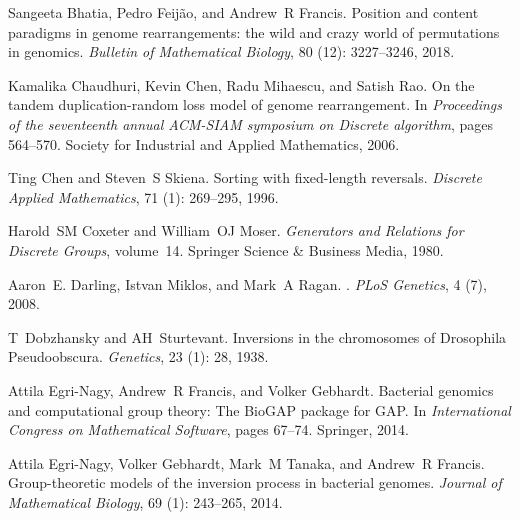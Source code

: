 \documentclass[utf8]{Frontiers_LaTex_Templates/frontiersFPHY} %
\numberwithin{equation}{section}
\begin{document}
\begin{thebibliography}{38}
Sangeeta Bhatia, Pedro Feij{\~a}o, and Andrew~R Francis.
\newblock Position and content paradigms in genome rearrangements: the wild and
  crazy world of permutations in genomics.
\newblock \emph{Bulletin of Mathematical Biology}, 80 (12):
  3227--3246, 2018.

Kamalika Chaudhuri, Kevin Chen, Radu Mihaescu, and Satish Rao.
\newblock On the tandem duplication-random loss model of genome rearrangement.
\newblock In \emph{Proceedings of the seventeenth annual ACM-SIAM symposium on
  Discrete algorithm}, pages 564--570. Society for Industrial and Applied
  Mathematics, 2006.

Ting Chen and Steven~S Skiena.
\newblock Sorting with fixed-length reversals.
\newblock \emph{Discrete Applied Mathematics}, 71 (1):
  269--295, 1996.

Harold~SM Coxeter and William~OJ Moser.
\newblock \emph{Generators and Relations for Discrete Groups}, volume~14.
\newblock Springer Science \& Business Media, 1980.

Aaron~E. Darling, Istvan Miklos, and Mark~A Ragan.
.
\newblock \emph{PLoS Genetics}, 4 (7), 2008.

T~Dobzhansky and AH~Sturtevant.
\newblock Inversions in the chromosomes of {D}rosophila {P}seudoobscura.
\newblock \emph{Genetics}, 23 (1): 28, 1938.

Attila Egri-Nagy, Andrew~R Francis, and Volker Gebhardt.
\newblock Bacterial genomics and computational group theory: The {BioGAP}
  package for {GAP}.
\newblock In \emph{International Congress on Mathematical Software}, pages
  67--74. Springer, 2014{}.

Attila Egri-Nagy, Volker Gebhardt, Mark~M Tanaka, and Andrew~R Francis.
\newblock Group-theoretic models of the inversion process in bacterial genomes.
\newblock \emph{Journal of Mathematical Biology}, 69 (1):
  243--265, 2014{}.


\end{thebibliography}
\end{document}
